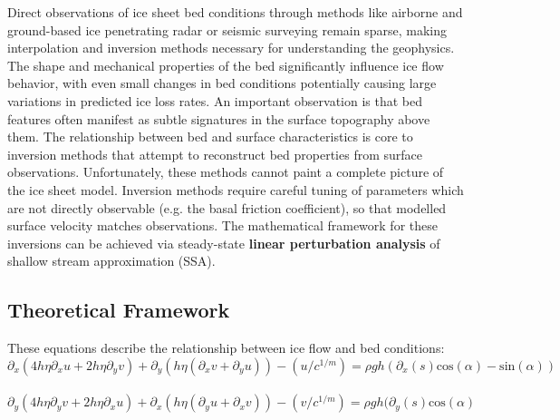Direct observations of ice sheet bed conditions through methods like airborne and ground-based ice penetrating radar or seismic surveying remain sparse, making interpolation and inversion methods necessary for understanding the geophysics. The shape and mechanical properties of the bed significantly influence ice flow behavior, with even small changes in bed conditions potentially causing large variations in predicted ice loss rates. An important observation is that bed features often manifest as subtle signatures in the surface topography above them\cite{Ockenden_2022}.
The relationship between bed and surface characteristics is core to inversion methods that attempt to reconstruct bed properties from surface observations. Unfortunately, these methods cannot paint a complete picture of the ice sheet model. Inversion methods require careful tuning of parameters which are not directly observable  (e.g. the basal friction coefficient), so that modelled surface velocity matches observations. The mathematical framework for these inversions can be achieved via steady-state \textbf{linear perturbation analysis} of shallow stream approximation (SSA)\cite{Gudmundsson_2008}.

\subsection*{Theoretical Framework}



These equations describe the relationship between ice flow and bed conditions:
\begin{equation}\partial_{x} (4 h \eta \partial_{x} u + 2 h \eta \partial_y v) + \partial_{y}(h \eta( \partial_{x} v + \partial_{y} u)) - (u/c^{1/m}) = \rho g h ( \partial_{x} (s) \mathrm{cos}(\alpha) - \mathrm{sin}(\alpha))
\end{equation}\label{2.1}\\
\begin{equation}\partial_{y} (4 h \eta \partial_{y} v + 2 h \eta \partial_x u) + \partial_{x}(h \eta( \partial_{y} u + \partial_{x} v)) - (v/c^{1/m}) = \rho g h ( \partial_{y} (s) \mathrm{cos}(\alpha)
\end{equation}\label{2.2}

